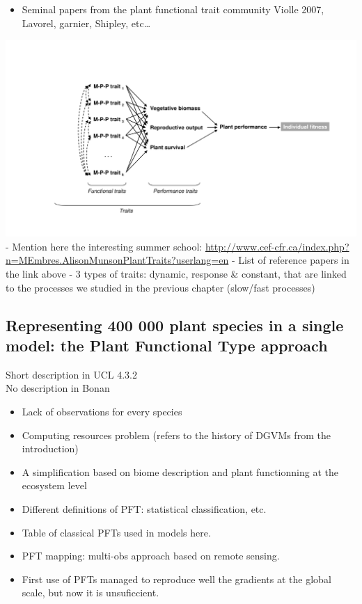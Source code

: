 \documentclass[12pt,oneside]{book}
\providecommand{\tightlist}{%
  \setlength{\itemsep}{0pt}\setlength{\parskip}{0pt}}
\begin{document}
\begin{itemize}
\tightlist
\item
  Seminal papers from the plant functional trait community Violle 2007,
  Lavorel, garnier, Shipley, etc\ldots{}
\end{itemize}

\includegraphics{figures/Violle2007.jpg} - Mention here the interesting
summer school:
\url{http://www.cef-cfr.ca/index.php?n=MEmbres.AlisonMunsonPlantTraits?userlang=en}
- List of reference papers in the link above - 3 types of traits:
dynamic, response \& constant, that are linked to the processes we
studied in the previous chapter (slow/fast processes)

\subsection{Representing 400 000 plant species in a single model: the
Plant Functional Type
approach}\label{representing-400-000-plant-species-in-a-single-model-the-plant-functional-type-approach}

Short description in UCL 4.3.2\\
No description in Bonan

\begin{itemize}
\tightlist
\item
  Lack of observations for every species
\item
  Computing resources problem (refers to the history of DGVMs from the
  introduction)
\item
  A simplification based on biome description and plant functionning at
  the ecosystem level
\item
  Different definitions of PFT: statistical classification, etc.
\item
  Table of classical PFTs used in models here.
\item
  PFT mapping: multi-obs approach based on remote sensing.
\item
  First use of PFTs managed to reproduce well the gradients at the
  global scale, but now it is unsuficcient.
\end{itemize}
\end{document}
